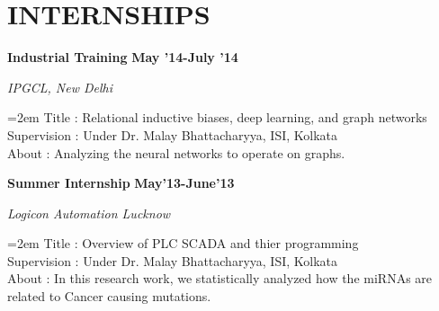 \documentclass[paper=a4,fontsize=11pt]{scrartcl} %
\newcommand{\sepspace}{\vspace*{1em}}		%
\newcommand{\NewPart}[1]{\section*{\uppercase{#1}}}
\newcommand{\EducationEntry}[4]{
		\noindent \textbf{#1} \hfill      %
		\textbf{#2} \par  %
		\noindent \textit{#3} \par        %
		\noindent\hangindent=2em\hangafter=0 \small #4 %
		\normalsize \par}
\newcommand{\WorkEntry}[4]{				  %
		\noindent \textbf{#1} \hfill      %
		\textbf{#2} \par  %
		\noindent \textit{#3} \par              %
		\noindent\hangindent=2em\hangafter=0 \small #4 %
		\normalsize \par}
\begin{document}
    \NewPart{Internships}
    {}
        \WorkEntry{Industrial Training} %
            {May '14-July '14} %
            {IPGCL, New Delhi} %
            {
                Title : Relational inductive biases, deep learning, and graph networks\\Supervision : Under Dr. Malay Bhattacharyya, ISI, Kolkata\\About : Analyzing the neural networks to operate on graphs.%
            }
        \sepspace
        \sepspace
        \WorkEntry{Summer Internship} %
            {May'13-June'13} %
            {Logicon Automation Lucknow} %
            {
                Title : Overview of PLC SCADA and thier programming\\Supervision : Under Dr. Malay Bhattacharyya, ISI, Kolkata\\About : In this research work, we statistically analyzed how the miRNAs are related to Cancer causing mutations.%
            }
        \sepspace
        \sepspace
\end{document}
